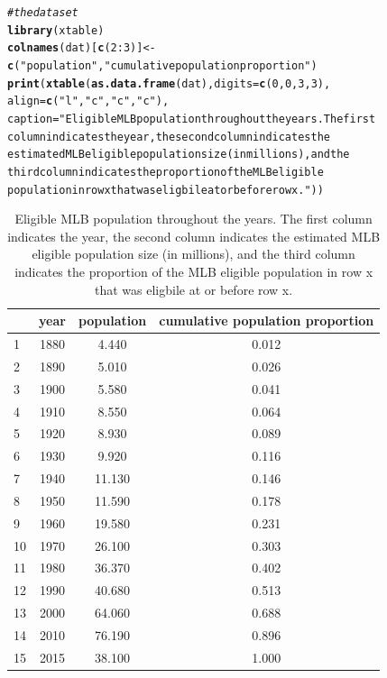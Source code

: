 \documentclass[11pt]{article}\usepackage[]{graphicx}\usepackage[]{color}
\makeatletter
\newcommand{\hlnum}[1]{\textcolor[rgb]{0.686,0.059,0.569}{#1}}%
\newcommand{\hlstr}[1]{\textcolor[rgb]{0.192,0.494,0.8}{#1}}%
\newcommand{\hlcom}[1]{\textcolor[rgb]{0.678,0.584,0.686}{\textit{#1}}}%
\newcommand{\hlopt}[1]{\textcolor[rgb]{0,0,0}{#1}}%
\newcommand{\hlstd}[1]{\textcolor[rgb]{0.345,0.345,0.345}{#1}}%
\newcommand{\hlkwb}[1]{\textcolor[rgb]{0.69,0.353,0.396}{#1}}%
\newcommand{\hlkwc}[1]{\textcolor[rgb]{0.333,0.667,0.333}{#1}}%
\newcommand{\hlkwd}[1]{\textcolor[rgb]{0.737,0.353,0.396}{\textbf{#1}}}%
\newenvironment{kframe}{%
 \def\at@end@of@kframe{}%
 \ifinner\ifhmode%
  \def\at@end@of@kframe{\end{minipage}}%
  \begin{minipage}{\columnwidth}%
 \fi\fi%
 \def\FrameCommand##1{\hskip\@totalleftmargin \hskip-\fboxsep
 \colorbox{shadecolor}{##1}\hskip-\fboxsep
     \hskip-\linewidth \hskip-\@totalleftmargin \hskip\columnwidth}%
 \MakeFramed {\advance\hsize-\width
   \@totalleftmargin\z@ \linewidth\hsize
   \@setminipage}}%
 {\par\unskip\endMakeFramed%
 \at@end@of@kframe}
\makeatother
\begin{document}
\begin{kframe}
\begin{alltt}
\hlcom{# the dataset}
\hlkwd{library}\hlstd{(xtable)}
\hlkwd{colnames}\hlstd{(dat)[}\hlkwd{c}\hlstd{(}\hlnum{2}\hlopt{:}\hlnum{3}\hlstd{)]} \hlkwb{<-} \hlkwd{c}\hlstd{(}\hlstr{"population"}\hlstd{,} \hlstr{"cumulative population proportion"}\hlstd{)}
\hlkwd{print}\hlstd{(}\hlkwd{xtable}\hlstd{(}\hlkwd{as.data.frame}\hlstd{(dat),} \hlkwc{digits} \hlstd{=} \hlkwd{c}\hlstd{(}\hlnum{0}\hlstd{,}\hlnum{0}\hlstd{,}\hlnum{3}\hlstd{,}\hlnum{3}\hlstd{),}
  \hlkwc{align} \hlstd{=} \hlkwd{c}\hlstd{(}\hlstr{"l"}\hlstd{,}\hlstr{"c"}\hlstd{,}\hlstr{"c"}\hlstd{,}\hlstr{"c"}\hlstd{),}
  \hlkwc{caption} \hlstd{=} \hlstr{"Eligible MLB population throughout the years. The first 
    column indicates the year, the second column indicates the 
    estimated MLB eligible population size (in millions), and the 
    third column indicates the proportion of the MLB eligible  
    population in row x that was eligbile at or before row x."}\hlstd{))}
\end{alltt}
\end{kframe}%
\begin{table}[ht]
\centering
\begin{tabular}{lccc}
  \hline
 & year & population & cumulative population proportion \\ 
  \hline
1 & 1880 & 4.440 & 0.012 \\ 
  2 & 1890 & 5.010 & 0.026 \\ 
  3 & 1900 & 5.580 & 0.041 \\ 
  4 & 1910 & 8.550 & 0.064 \\ 
  5 & 1920 & 8.930 & 0.089 \\ 
  6 & 1930 & 9.920 & 0.116 \\ 
  7 & 1940 & 11.130 & 0.146 \\ 
  8 & 1950 & 11.590 & 0.178 \\ 
  9 & 1960 & 19.580 & 0.231 \\ 
  10 & 1970 & 26.100 & 0.303 \\ 
  11 & 1980 & 36.370 & 0.402 \\ 
  12 & 1990 & 40.680 & 0.513 \\ 
  13 & 2000 & 64.060 & 0.688 \\ 
  14 & 2010 & 76.190 & 0.896 \\ 
  15 & 2015 & 38.100 & 1.000 \\ 
   \hline
\end{tabular}
\caption{Eligible MLB population throughout the years. The first 
    column indicates the year, the second column indicates the 
    estimated MLB eligible population size (in millions), and the 
    third column indicates the proportion of the MLB eligible  
    population in row x that was eligbile at or before row x.} 
\end{table}
\end{document}
